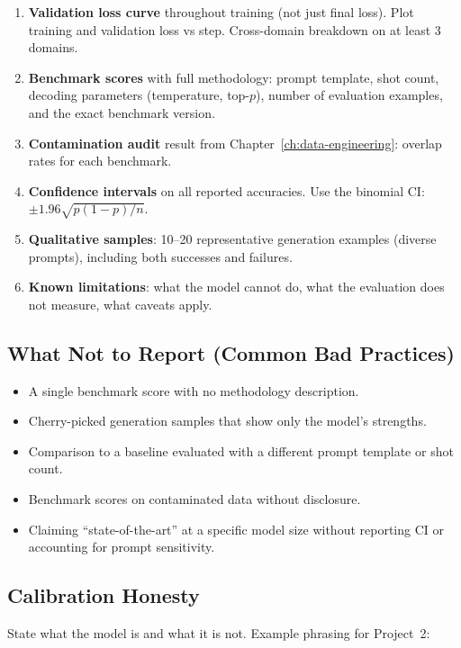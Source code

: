 \begin{enumerate}[nosep]
  \item \textbf{Validation loss curve} throughout training (not just final loss). Plot training and validation loss vs step. Cross-domain breakdown on at least 3 domains.
  \item \textbf{Benchmark scores} with full methodology: prompt template, shot count, decoding parameters (temperature, top-$p$), number of evaluation examples, and the exact benchmark version.
  \item \textbf{Contamination audit} result from Chapter~\ref{ch:data-engineering}: overlap rates for each benchmark.
  \item \textbf{Confidence intervals} on all reported accuracies. Use the binomial CI: $\pm 1.96\sqrt{p(1-p)/n}$.
  \item \textbf{Qualitative samples}: 10--20 representative generation examples (diverse prompts), including both successes and failures.
  \item \textbf{Known limitations}: what the model cannot do, what the evaluation does not measure, what caveats apply.
\end{enumerate}

\subsection{What Not to Report (Common Bad Practices)}

\begin{itemize}[nosep]
  \item A single benchmark score with no methodology description.
  \item Cherry-picked generation samples that show only the model's strengths.
  \item Comparison to a baseline evaluated with a different prompt template or shot count.
  \item Benchmark scores on contaminated data without disclosure.
  \item Claiming ``state-of-the-art'' at a specific model size without reporting CI or accounting for prompt sensitivity.
\end{itemize}

\subsection{Calibration Honesty}

State what the model is and what it is not. Example phrasing for Project~2:

